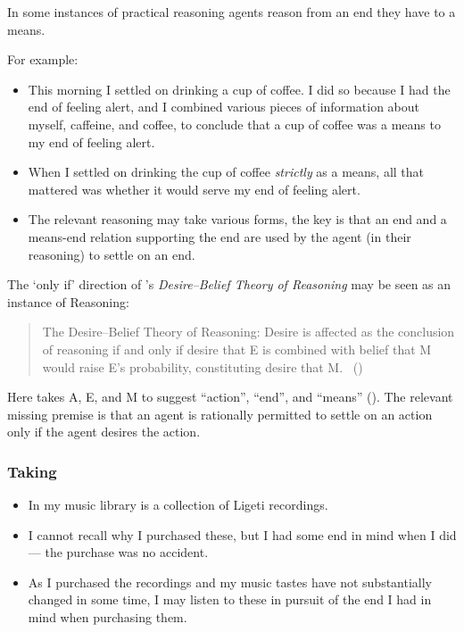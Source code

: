 \documentclass[10pt]{article}
\newcommand{\hozlinedash}[0]{%
  \noindent\hdashrule[0.5ex][c]{\textwidth}{.1pt}{2.5pt}
}
\newcommand{\schemaName}[1]{\textsf{#1}}
\begin{document}
\hozlinedash


In some instances of practical reasoning agents reason from an end they have to a means.

For example:
\begin{itemize}
\item This morning I settled on drinking a cup of coffee. I did so because I had the end of feeling alert, and I combined various pieces of information about myself, caffeine, and coffee, to conclude that a cup of coffee was a means to my end of feeling alert.
\item When I settled on drinking the cup of coffee \emph{strictly} as a means, all that mattered was whether it would serve my end of feeling alert.
\end{itemize}

\begin{itemize}
\item The relevant reasoning may take various forms, the key is that an end and a means-end relation supporting the end are used by the agent (in their reasoning) to settle on an end.
\end{itemize}




The `only if' direction of \citeauthor{Sinhababu:2017aa}'s \emph{Desire–Belief Theory of Reasoning} may be seen as an instance of \schemaName{Reasoning}:

\begin{quote}
  The Desire–Belief Theory of Reasoning: Desire is affected as the conclusion of reasoning if and only if desire that E is combined with belief that M would raise E’s probability, constituting desire that M.\nolinebreak
  \mbox{ }\hfill\mbox{(\citeyear[2,39]{Sinhababu:2017aa})}
\end{quote}
Here \citeauthor{Sinhababu:2017aa} takes A, E, and M to suggest ``action'', ``end'', and ``means'' (\citeyear[2]{Sinhababu:2017aa}).
The relevant missing premise is that an agent is rationally permitted to settle on an action only if the agent desires the action.


\hozlinedash

\subsubsection{Taking}
\label{sec:taking}

\begin{itemize}
\item In my music library is a collection of Ligeti recordings.
\item I cannot recall why I purchased these, but I had some end in mind when I did --- the purchase was no accident.
\item As I purchased the recordings and my music tastes have not substantially changed in some time, I may listen to these in pursuit of the end I had in mind when purchasing them.
\end{itemize}
\end{document}
